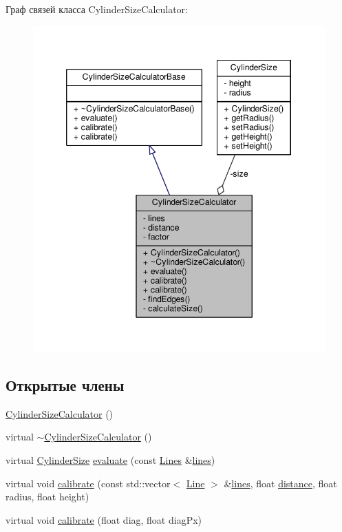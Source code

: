 Граф связей класса Cylinder\+Size\+Calculator\+:
\nopagebreak
\begin{figure}[H]
\begin{center}
\leavevmode
\includegraphics[width=346pt]{da/d2c/class_cylinder_size_calculator__coll__graph}
\end{center}
\end{figure}
\subsection*{Открытые члены}
\begin{DoxyCompactItemize}
\item 
\hyperlink{class_cylinder_size_calculator_ab4daaa75220e687cca3ce57e9db2fe57}{Cylinder\+Size\+Calculator} ()
\item 
virtual \hyperlink{class_cylinder_size_calculator_af8ff9a4ab970aa5fcdca273112789978}{$\sim$\+Cylinder\+Size\+Calculator} ()
\item 
virtual \hyperlink{class_cylinder_size}{Cylinder\+Size} \hyperlink{class_cylinder_size_calculator_a979a607bd694c5819355793d231c5df2}{evaluate} (const \hyperlink{class_cylinder_size_calculator_a7c30882e5312856d6757dc0022eb231f}{Lines} \&\hyperlink{class_cylinder_size_calculator_a8a329c2526e67545603769c720d76692}{lines})
\item 
virtual void \hyperlink{class_cylinder_size_calculator_a411f74a0f0baa7c393fe53c36d957fd4}{calibrate} (const std\+::vector$<$ \hyperlink{class_line}{Line} $>$ \&\hyperlink{class_cylinder_size_calculator_a8a329c2526e67545603769c720d76692}{lines}, float \hyperlink{class_cylinder_size_calculator_a1d88b87623a24582f968bb06acd80b8c}{distance}, float radius, float height)
\item 
virtual void \hyperlink{class_cylinder_size_calculator_ace80de293c2d4626b65e83fcb0fcde54}{calibrate} (float diag, float diag\+Px)
\end{DoxyCompactItemize}
